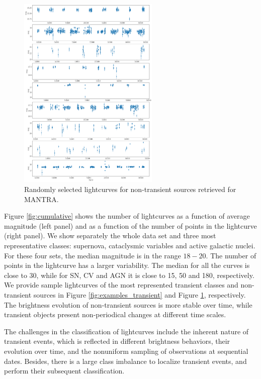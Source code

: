 \documentclass[twocolumn]{aastex62}
\begin{document}
\begin{figure}
\begin{center}
  \includegraphics[width=0.6\textwidth]{examples_nontransient.pdf}
\end{center}
  \caption{Randomly selected lightcurves for non-transient sources retrieved for MANTRA.}
  \label{fig:examples_non_transient}
\end{figure} 

Figure \ref{fig:cumulative} shows the number of lightcurves as a
function of average magnitude (left panel) and as a function of the
number of points in the lightcurve (right panel).
We show separately the whole data set and three most representative
classes: supernova, cataclysmic variables and active galactic nuclei. 
For these four sets, the median magnitude is in the range $18-20$. 
The number of points in the lightcurve has a larger variability.
The median for all the curves is close to 30, while for SN, CV and
AGN it is close to 15, 50 and 180, respectively. 
We provide sample lightcurves of the most represented transient classes 
and non-transient sources in Figure \ref{fig:examples_transient} and Figure \ref{fig:examples_non_transient}, respectively. 
The brightness evolution of non-transient sources is more stable over time, 
while transient objects present non-periodical changes at different time scales. 


The challenges in the classification of lightcurves 
include the inherent nature of transient events, which is reflected 
in different brightness behaviors, their evolution over time, and 
the nonuniform sampling of observations at sequential dates. 
Besides, there is a large class imbalance to localize transient events, 
and perform their subsequent classification. 
\end{document}
